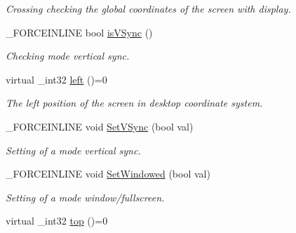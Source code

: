 \begin{DoxyCompactItemize}
\begin{DoxyCompactList}\small\item\em Crossing checking the global coordinates of the screen with display. \end{DoxyCompactList}\item 
\hypertarget{classcsad_1_1_display_a26d239250ad328c5ed9ff7186753f015}{\-\_\-\-F\-O\-R\-C\-E\-I\-N\-L\-I\-N\-E bool \hyperlink{classcsad_1_1_display_a26d239250ad328c5ed9ff7186753f015}{is\-V\-Sync} ()}\label{classcsad_1_1_display_a26d239250ad328c5ed9ff7186753f015}

\begin{DoxyCompactList}\small\item\em Checking mode vertical sync. \end{DoxyCompactList}\item 
\hypertarget{classcsad_1_1_display_a8685f55f9af5bacbb512f4f65347fbdc}{virtual \-\_\-int32 \hyperlink{classcsad_1_1_display_a8685f55f9af5bacbb512f4f65347fbdc}{left} ()=0}\label{classcsad_1_1_display_a8685f55f9af5bacbb512f4f65347fbdc}

\begin{DoxyCompactList}\small\item\em The left position of the screen in desktop coordinate system. \end{DoxyCompactList}\item 
\hypertarget{classcsad_1_1_display_aa13dbec69c7ad3b4025a9f0ff958e276}{\-\_\-\-F\-O\-R\-C\-E\-I\-N\-L\-I\-N\-E void \hyperlink{classcsad_1_1_display_aa13dbec69c7ad3b4025a9f0ff958e276}{Set\-V\-Sync} (bool val)}\label{classcsad_1_1_display_aa13dbec69c7ad3b4025a9f0ff958e276}

\begin{DoxyCompactList}\small\item\em Setting of a mode vertical sync. \end{DoxyCompactList}\item 
\hypertarget{classcsad_1_1_display_aa16c4a6dd845993283871a224a67511f}{\-\_\-\-F\-O\-R\-C\-E\-I\-N\-L\-I\-N\-E void \hyperlink{classcsad_1_1_display_aa16c4a6dd845993283871a224a67511f}{Set\-Windowed} (bool val)}\label{classcsad_1_1_display_aa16c4a6dd845993283871a224a67511f}

\begin{DoxyCompactList}\small\item\em Setting of a mode window/fullscreen. \end{DoxyCompactList}\item 
\hypertarget{classcsad_1_1_display_a3ac4c7a9a4585d709fb5b434c64429d9}{virtual \-\_\-int32 \hyperlink{classcsad_1_1_display_a3ac4c7a9a4585d709fb5b434c64429d9}{top} ()=0}\label{classcsad_1_1_display_a3ac4c7a9a4585d709fb5b434c64429d9}


\end{DoxyCompactItemize}
